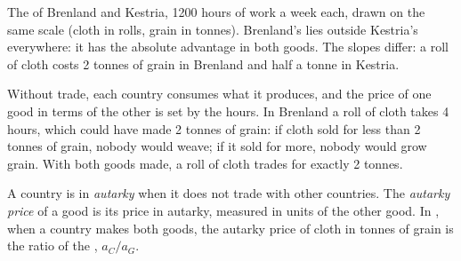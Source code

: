 \begin{omfigure}

{\small The  of Brenland and Kestria, \num{1200} hours of work a week each,
drawn on the same scale (cloth in rolls, grain in tonnes). Brenland's lies outside Kestria's everywhere:
it has the absolute advantage in both goods. The slopes differ: a roll of cloth costs 2 tonnes of grain in
Brenland and half a tonne in Kestria.}
\end{omfigure}

Without trade, each country consumes what it produces, and the price of one good in terms of the other
is set by the hours. In Brenland a roll of cloth takes 4 hours, which could have made 2 tonnes of grain:
if cloth sold for less than 2 tonnes of grain, nobody would weave; if it sold for more, nobody would grow
grain. With both goods made, a roll of cloth trades for exactly 2 tonnes.

\begin{definition}\label{def:g10:ricardo-model:autarky-price}
A country is in \emph{autarky} when it does not trade with other countries. The \emph{autarky
price} of a good is its price in autarky, measured in units of the other good. In
, when a country makes both goods, the autarky price of cloth in tonnes of grain is the
ratio of the , $a_C / a_G$.
\end{definition}

